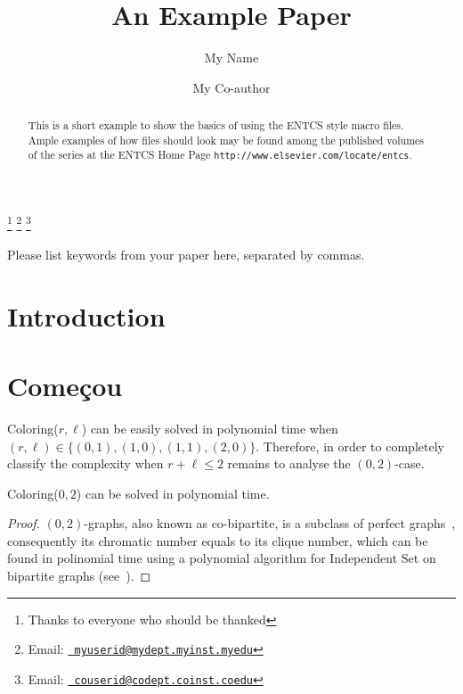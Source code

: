 \documentclass[9pt]{../document-types/entcs} \usepackage{../document-types/entcsmacro}
\begin{document}
\begin{frontmatter}
  \title{An Example Paper} \author{My
    Name}
  \address{My Department\\ My University\\
    My City, My Country} \author{My Co-author}
  \address{My Co-author's Department\\My Co-author's University\\
    My Co-author's City, My Co-author's Country} \thanks[ALL]{Thanks
    to everyone who should be thanked} \thanks[myemail]{Email:
    \href{mailto:myuserid@mydept.myinst.myedu} {\texttt{\normalshape
        myuserid@mydept.myinst.myedu}}} \thanks[coemail]{Email:
    \href{mailto:couserid@codept.coinst.coedu} {\texttt{\normalshape
        couserid@codept.coinst.coedu}}}
\begin{abstract}
  This is a short example to show the basics of using the ENTCS style
  macro files.  Ample examples of how files should look may be found
  among the published volumes of the series at the ENTCS Home Page
  \texttt{http://www.elsevier.com/locate/entcs}.
\end{abstract}
\begin{keyword}
  Please list keywords from your paper here, separated by commas.
\end{keyword}
\end{frontmatter}





\section{Introduction}\label{intro}

\section{Começou}

{\sc Coloring($r,\ell$)} can be easily solved in polynomial time when $(r,\ell) \in \{(0,1),(1,0),(1,1),(2,0)\}$.
Therefore, in order to completely classify the complexity when $r+\ell \leq 2$ remains to analyse the $(0,2)$-case.

	\begin{lemma}
{\sc Coloring($0,2$)} can be solved in polynomial time.
\end{lemma}
	\begin{proof}
$(0,2)$-graphs, also known as co-bipartite, is a subclass of perfect graphs~\cite{bollo98}, consequently its chromatic number
equals to its clique number, which can be found in polinomial time using a polynomial algorithm for {\sc Independent Set}
on bipartite graphs (see~\cite{konig31,zing12}).
	\end{proof}
\end{document}
